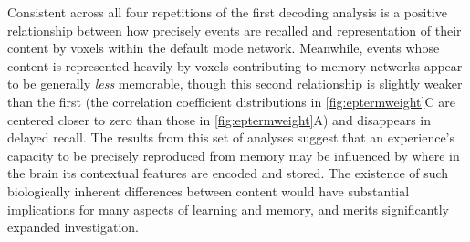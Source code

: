 \documentclass{article}
\begin{document}
Consistent across all four repetitions of the first decoding analysis is a positive relationship between how precisely events are recalled and representation of their content by voxels within the default mode network.  Meanwhile, events whose content is represented heavily by voxels contributing to memory networks appear to be generally \textit{less} memorable, though this second relationship is slightly weaker than the first (the correlation coefficient distributions in \ref{fig:eptermweight}C are centered closer to zero than those in \ref{fig:eptermweight}A) and disappears in delayed recall.  The results from this set of analyses suggest that an experience's capacity to be precisely reproduced from memory may be influenced by where in the brain its contextual features are encoded and stored.  The existence of such biologically inherent differences between content would have substantial implications for many aspects of learning and memory, and merits significantly expanded investigation.

\end{document}
